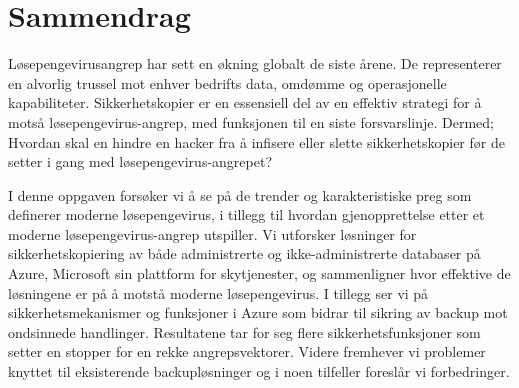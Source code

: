\chapter*{Sammendrag}
Løsepengevirusangrep har sett en økning globalt de siste årene. De representerer en alvorlig trussel mot enhver bedrifts data, omdømme og operasjonelle kapabiliteter. Sikkerhetskopier er en essensiell del av en effektiv strategi for å motså løsepengevirus-angrep, med funksjonen til en siste forsvarslinje. Dermed; Hvordan skal en hindre en hacker fra å infisere eller slette sikkerhetskopier før de setter i gang med løsepengevirus-angrepet?

I denne oppgaven forsøker vi å se på de trender og karakteristiske preg som definerer moderne løsepengevirus, i tillegg til hvordan gjenopprettelse etter et moderne løsepengevirus-angrep utspiller. Vi utforsker løsninger for sikkerhetskopiering av både administrerte og ikke-administrerte databaser på Azure, Microsoft sin plattform for skytjenester, og sammenligner hvor effektive de løsningene er på å motstå moderne løsepengevirus. I tillegg ser vi på sikkerhetsmekanismer og funksjoner i Azure som bidrar til sikring av backup mot ondsinnede handlinger.
Resultatene tar for seg flere sikkerhetsfunksjoner som setter en stopper for en rekke angrepsvektorer. Videre fremhever vi problemer knyttet til eksisterende backupløsninger og i noen tilfeller foreslår vi forbedringer. 



